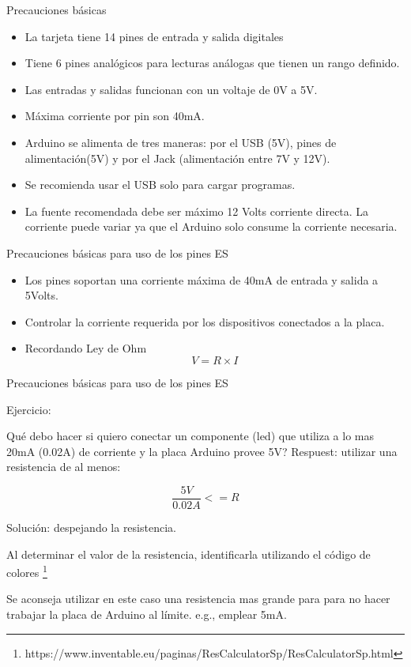 \documentclass{beamer}
\theoremstyle{definition}
\begin{document}
\begin{frame}{Precauciones básicas}

\begin{itemize}
\item La tarjeta tiene 14 pines de entrada y salida digitales
\item Tiene 6 pines analógicos para lecturas análogas que tienen un rango definido.
\item Las entradas y salidas funcionan con un voltaje de 0V a 5V.
\item Máxima corriente por pin son 40mA.
\item Arduino se alimenta de tres maneras: por el USB (5V), pines de alimentación(5V) y por el Jack (alimentación entre 7V y 12V).
\item Se recomienda usar el USB solo para cargar programas. 
\item La fuente recomendada debe ser máximo 12 Volts corriente directa. La corriente puede variar ya que el Arduino solo consume la corriente necesaria.
\end{itemize}

\end{frame}


\begin{frame}{Precauciones básicas para uso de los pines E\/S}

\begin{itemize}
\item Los pines soportan una corriente máxima de 40mA de entrada y salida a 5Volts.
\item Controlar la corriente requerida por los dispositivos conectados a la placa. 
\item Recordando Ley de Ohm
$$V = R \times I$$
\end{itemize}


\end{frame}


\begin{frame}{Precauciones básicas para uso de los pines E\/S}

Ejercicio:

Qué debo hacer si quiero conectar un componente (led) que utiliza a lo mas 20mA (0.02A) de corriente y la placa Arduino provee 5V? Respuest: utilizar una resistencia de al menos:

$$\frac{5V}{0.02A} <= R $$

Solución: despejando la resistencia.

Al determinar el valor de la resistencia, identificarla utilizando el código de colores \footnote{https://www.inventable.eu/paginas/ResCalculatorSp/ResCalculatorSp.html}

Se aconseja utilizar en este caso una resistencia mas grande para para no hacer trabajar la placa de Arduino al límite. e.g., emplear 5mA.


\end{frame}
\end{document}
